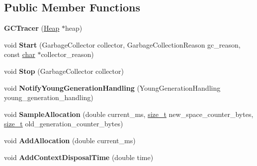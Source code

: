 \subsection*{Public Member Functions}
\begin{DoxyCompactItemize}
\item 
\mbox{\label{classv8_1_1internal_1_1GCTracer_a79fdcc22e69a58ebe5db7f3a013f323e}} 
{\bfseries G\+C\+Tracer} (\mbox{\hyperlink{classv8_1_1internal_1_1Heap}{Heap}} $\ast$heap)
\item 
\mbox{\label{classv8_1_1internal_1_1GCTracer_a1765d38ba319decaad271842a6d6273e}} 
void {\bfseries Start} (Garbage\+Collector collector, Garbage\+Collection\+Reason gc\+\_\+reason, const \mbox{\hyperlink{classchar}{char}} $\ast$collector\+\_\+reason)
\item 
\mbox{\label{classv8_1_1internal_1_1GCTracer_a4c82602400b0339441c5134365cf4a8f}} 
void {\bfseries Stop} (Garbage\+Collector collector)
\item 
\mbox{\label{classv8_1_1internal_1_1GCTracer_a24d35380e1418246714d42029f5a720d}} 
void {\bfseries Notify\+Young\+Generation\+Handling} (Young\+Generation\+Handling young\+\_\+generation\+\_\+handling)
\item 
\mbox{\label{classv8_1_1internal_1_1GCTracer_af89e3e4c9db41e5151ce30dd84c7e3de}} 
void {\bfseries Sample\+Allocation} (double current\+\_\+ms, \mbox{\hyperlink{classsize__t}{size\+\_\+t}} new\+\_\+space\+\_\+counter\+\_\+bytes, \mbox{\hyperlink{classsize__t}{size\+\_\+t}} old\+\_\+generation\+\_\+counter\+\_\+bytes)
\item 
\mbox{\label{classv8_1_1internal_1_1GCTracer_a0e906f7c130822009e5f8703fe60d538}} 
void {\bfseries Add\+Allocation} (double current\+\_\+ms)
\item 
\mbox{\label{classv8_1_1internal_1_1GCTracer_a425caf27264aab1b8fbe9c42f12944d3}} 
void {\bfseries Add\+Context\+Disposal\+Time} (double time)
\item 
\mbox{\label{classv8_1_1internal_1_1GCTracer_a99b2ff79d32e90b2b3ad4683c48e8c87}} 

\end{DoxyCompactItemize}
